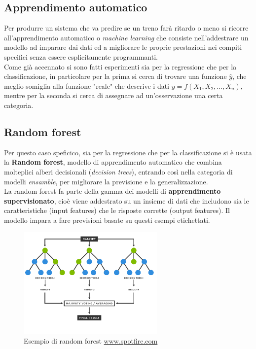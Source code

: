 \documentclass[italian,12pt,a4paper]{article}
\begin{document}
		\subsection{Apprendimento automatico}
			Per produrre un sistema che va predire se un treno farà ritardo o meno si ricorre all'apprendimento automatico o \textit{machine learning} che consiste nell'addestrare un modello ad imparare dai dati ed a migliorare le proprie prestazioni nei compiti specifici senza essere esplicitamente programmanti.\\
			Come già accennato si sono fatti esperimenti sia per la regressione che per la classificazione, in particolare per la prima si cerca di trovare una funzione $\hat{y}$, che meglio somiglia alla funzione "reale" che descrive i dati $y = f(X_1, X_2, \dots, X_n)$, mentre per la seconda si cerca di assegnare ad un'osservazione una certa categoria.
	
		\subsection{Random forest}
			Per questo caso speficico, sia per la regressione che per la classificazione si è usata la \textbf{Random forest}, modello di apprendimento automatico che combina molteplici alberi decisionali (\textit{decision trees}), entrando così nella categoria di modelli \textit{ensamble}, per migliorare la previsione e la generalizzazione.\\
			La random forest fa parte della gamma dei modelli di \textbf{apprendimento supervisionato}, cioè viene addestrato su un insieme di dati che includono sia le caratteristiche (input features) che le risposte corrette (output features). 
			Il modello impara a fare previsioni basate su questi esempi etichettati.
				
			\begin{figure}[!h]
				\centering
				\includegraphics[width=270px]{img/random-forest-diagram}
				\caption{Esempio di random forest \href{https://www.spotfire.com/glossary/what-is-a-random-forest}{www.spotfire.com}}
			\end{figure}
		
\end{document}
